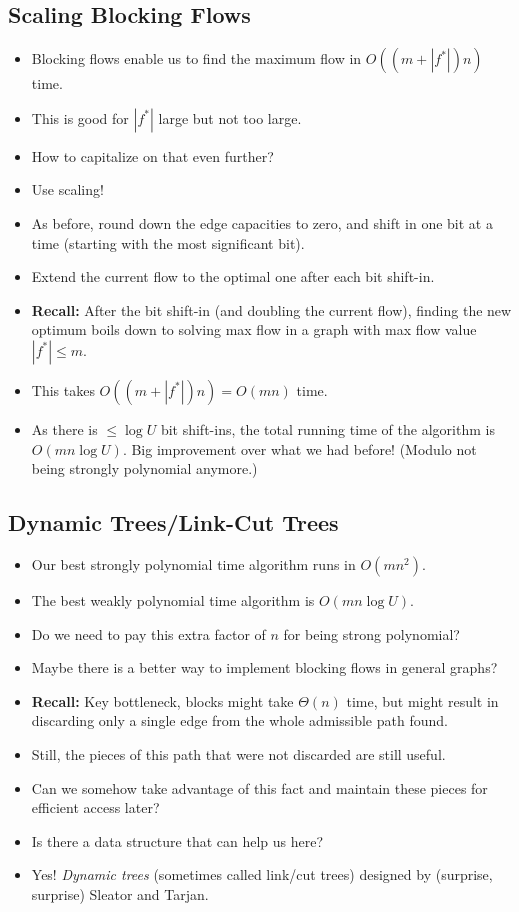 \documentclass{article}
\begin{document}
\subsection{Scaling Blocking Flows}

\begin{itemize}
\item Blocking flows enable us to find the maximum flow in $O((m+|f^*|)n)$ time.
\item This is good for $|f^*|$ large but not too large.
\item How to capitalize on that even further?
\item Use scaling!
\item As before, round down the edge capacities to zero, and shift in one bit at a time (starting with the most significant bit). 
\item Extend the current flow to the optimal one after each bit shift-in. 
\item \textbf{Recall:} After the bit shift-in (and doubling the current flow), finding the new optimum boils down to solving max flow in a graph with max flow value $|f^*|\leq m$. 
\item This takes $O((m+|f^*|)n)=O(mn)$ time. 
\item As there is $\leq \log U$ bit shift-ins, the total running time of the algorithm is $O(mn\log U)$. Big improvement over what we had before! (Modulo not being strongly polynomial anymore.) 
\end{itemize}

\subsection{Dynamic Trees/Link-Cut Trees}

\begin{itemize}
\item Our best strongly polynomial time algorithm runs in $O(mn^2)$. 
\item The best weakly polynomial time algorithm is $O(mn\log U)$. 
\item Do we need to pay this extra factor of $n$ for being strong polynomial?
\item Maybe there is a better way to implement blocking flows in general graphs?
\item \textbf{Recall:} Key bottleneck, blocks might take $\Theta(n)$ time, but might result in discarding only a single edge from the whole admissible path found. 
\item Still, the pieces of this path that were not discarded are still useful. 
\item Can we somehow take advantage of this fact and maintain these pieces for efficient access later?
\item Is there a data structure that can help us here?
\item Yes! {\em Dynamic trees} (sometimes called link/cut trees) designed by (surprise, surprise) Sleator and Tarjan. 

\end{itemize}
\end{document}
